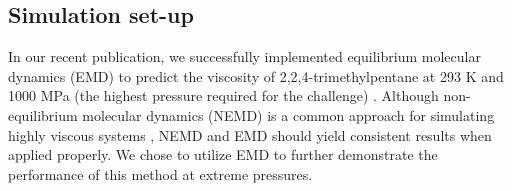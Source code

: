 \documentclass[preprint,review,12pt]{elsarticle}
\begin{document}
	
	
	
	
	\subsection{Simulation set-up}
		


In our recent publication, we successfully implemented equilibrium molecular dynamics (EMD) to predict the viscosity of 2,2,4-trimethylpentane at 293 K and 1000 MPa (the highest pressure required for the challenge) \cite{Postdoc_3}. Although non-equilibrium molecular dynamics (NEMD) is a common approach for simulating highly viscous systems \cite{McCabe2001,Liu2015}, NEMD and EMD should yield consistent results when applied properly. We chose to utilize EMD to further demonstrate the performance of this method at extreme pressures. 
\end{document}
